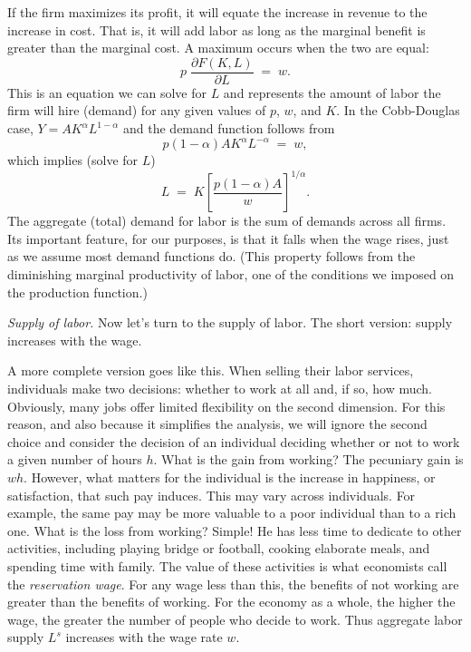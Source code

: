 \documentclass[letterpaper,12pt]{article}
\begin{document}
If the firm maximizes its profit, it will equate the increase in
revenue to the increase in cost. That is, it will add labor as
long as the marginal benefit is greater than the marginal cost.  A
maximum occurs when the two are equal:
%
\[
    p \; \frac{\partial F(K,L)}{\partial L} \;=\; w .
\]
%
This is an equation we can solve for $L$ and represents the amount
of labor the firm will hire (demand) for any given values of $p$,
$w$, and $K$.  In the Cobb-Douglas case, $ Y = A K^\alpha
L^{1-\alpha}$ and the demand function follows from
%
\begin{equation*}
    p (1-\alpha) A K^{\alpha}L^{-\alpha} \;=\; w ,
\end{equation*}
%
which implies (solve for $L$)
%
\begin{equation}
    L \;=\; K\left[\frac{ p (1-\alpha) A}{w}\right]^{{1}/{\alpha}}.
    \label{eq:ld}
\end{equation}
%
The aggregate (total) demand for labor is the sum of demands
across all firms. Its important feature, for our purposes, is that
it falls when the wage rises, just as we assume most demand
functions do. (This property follows from the diminishing marginal
productivity of labor, one of the conditions we imposed on the
production function.)

{\it Supply of labor.\/}
Now let's turn to the supply of labor. The short version: supply
increases with the wage.


A more complete version goes like this. 
When selling their labor services, individuals
make two decisions: whether to work at all and, if so, how much.  
Obviously, many jobs offer limited flexibility on the
second dimension.  For this reason, and also because it simplifies
the analysis, we will ignore the second choice and consider the
decision of an individual deciding whether or not to work a given
number of hours $h$.  What is the gain from working? The pecuniary
gain is $wh$. However, what matters for the individual is the
increase in happiness, or satisfaction, that such pay induces.
This may vary across individuals.  For example, the same pay may
be more valuable to a poor individual than to a rich one. What is
the loss from working? Simple!  He has less time to dedicate to
other activities, including playing bridge or football, cooking
elaborate meals, and spending time with family. The value of these
activities is what economists call the \textit{reservation wage}.
For any wage less than this, the benefits of not working are
greater than the benefits of working. For the economy as a whole,
the higher the wage, the greater the number of people 
who decide to work.
Thus aggregate labor supply $L^{s}$ increases with the wage rate
$w$.
\end{document}
